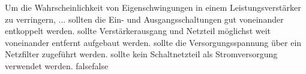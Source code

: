     {Um die Wahrscheinlichkeit von Eigenschwingungen in einem Leistungsverstärker zu verringern, ...}
    {sollten die Ein- und Ausgangsschaltungen gut voneinander entkoppelt werden.}
    {sollte Verstärkerausgang und Netzteil möglichst weit voneinander entfernt aufgebaut werden.}
    {sollte die Versorgungsspannung über ein Netzfilter zugeführt werden.}
    {sollte kein Schaltnetzteil als Stromversorgung verwendet werden.}
    {false}{false}